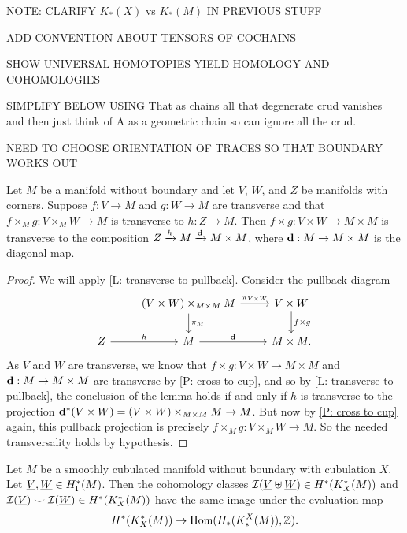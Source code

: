 \documentclass{amsart}
\begin{document}
 NOTE: CLARIFY $K_*(X)$ vs $K_*(M)$ IN PREVIOUS STUFF

ADD CONVENTION ABOUT TENSORS OF COCHAINS

SHOW UNIVERSAL HOMOTOPIES YIELD HOMOLOGY AND COHOMOLOGIES

SIMPLIFY BELOW USING That as chains all that degenerate crud vanishes and then just think of A as a geometric chain so can ignore all the crud. 

NEED TO CHOOSE ORIENTATION OF TRACES SO THAT BOUNDARY WORKS OUT


\begin{lemma}\label{L: trans diag cube}
Let $M$ be a manifold without boundary and let $V$, $W$, and $Z$ be  manifolds with corners. Suppose $f:V\to M$ and $g:W\to M$ are transverse and that $f\times_Mg:V\times_MW\to M$ is transverse to $h:Z\to M$. Then $f\times g:V\times W\to M\times M$ is transverse to the composition $Z\xrightarrow{h}M\xrightarrow{\mathbf{d}}M\times M$, where $\mathbf{d}:M\to M\times M$ is the diagonal map. 
\end{lemma}
\begin{proof}
We will apply \cref{L: transverse to pullback}. Consider the pullback diagram
	\[
	\begin{tikzcd}
		& (V \times W)\times_{M\times M} M \arrow[r, "\pi_{V\times W}"] \arrow[d, "\pi_M"] & V\times W \arrow[d, "f\times g"] \\
		Z \arrow[r, "h"] & M \arrow[r, "\diag"]&  M\times M.
	\end{tikzcd}
	\]
As $V$ and $W$ are transverse, we know that $f\times g:V\times W\to M\times M$ and $\mathbf{d}:M\to M\times M$ are transverse by \cref{P: cross to cup}, and so by \cref{L: transverse to pullback}, the conclusion of the lemma holds if and only if $h$ is transverse to the projection $\mathbf{d}^*(V\times W)=(V \times W)\times_{M\times M} M \to M$. But now by \cref{P: cross to cup} again, this pullback projection is precisely $f\times_Mg:V\times_MW\to M$. So the needed transversality holds by hypothesis. 
\end{proof}



\begin{proposition}
Let $M$ be a smoothly cubulated manifold without boundary with cubulation $X$. Let $\underline{V},\underline{W}\in H^*_\Gamma(M)$. Then the cohomology classes $\mathcal{I}(\underline{V}\uplus\underline{W})\in H^*(K_X^*(M))$ and $\mathcal{I}(\underline{V}) \smile \mathcal{I}(\underline{W})\in H^*(K_X^*(M))$ have the same image under the evaluation map $$H^*(K_X^*(M))\to \textup{Hom}(H_*(K_*^X(M)),\mathbb{Z}).$$ 
\end{proposition}
\end{document}
